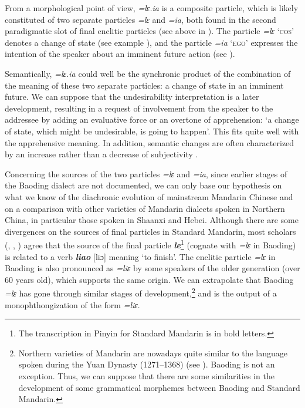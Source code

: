 \documentclass[output=paper,colorlinks,citecolor=brown, language=chinese]{langscibook}
\begin{document}
From a morphological point of view, \textit{=lɛ.ia} is a composite particle, which is likely constituted of two separate particles \textit{=lɛ} and \textit{=ia}, both found in the second paradigmatic slot of final enclitic particles (see  above in ). The particle \textit{=lɛ} \textsc{`cos'} denotes a change of state (see example ), and the particle \textit{=ia} \textsc{`ego'} expresses the intention of the speaker about an imminent future action (see ).

Semantically, \textit{=lɛ.ia} could well be the synchronic product of the combination of the meaning of these two separate particles: a change of state in an imminent future. We can suppose that the undesirability interpretation is a later development, resulting in a request of involvement from the speaker to the addressee by adding an evaluative force or an overtone of apprehension: `a change of state, which might be undesirable, is going to happen'. This fits quite well with the apprehensive meaning. In addition, semantic changes are often characterized by an increase rather than a decrease of subjectivity \citep[49]{Traugott1989}.

Concerning the sources of the two particles \textit{=lɛ} and \textit{=ia}, since earlier stages of the Baoding dialect are not documented, we can only base our hypothesis on what we know of the diachronic evolution of mainstream Mandarin Chinese and on a comparison with other varieties of Mandarin dialects spoken in Northern China, in particular those spoken in Shaanxi and Hebei. Although there are some divergences on the sources of final particles in Standard Mandarin, most scholars (\cite[Chapter 3]{Cao1987}, \cite[351]{Ōta1987}, \cite{Liu1985}) agree that the source of the final particle \textit{\textbf{le}}\footnote{The transcription in Pinyin for Standard Mandarin is in bold letters.} (cognate with \textit{=lɛ} in Baoding) is related to a verb \textit{\textbf{liao}} [liɔ] meaning `to finish'. The enclitic particle \textit{=lɛ} in Baoding is also pronounced as \textit{=liɛ} by some speakers of the older generation (over 60 years old), which supports the same origin. We can extrapolate that Baoding \textit{=lɛ} has gone through similar stages of development,\footnote{Northern varieties of Mandarin are nowadays quite similar to the language spoken during the Yuan Dynasty (1271--1368) (see \cite[Chapter I]{LiZuDing2009}). Baoding is not an exception. Thus, we can suppose that there are some similarities in the development of some grammatical morphemes between Baoding and Standard Mandarin.} and is the output of a monophthongization of the form \textit{=liɛ}.
\end{document}
